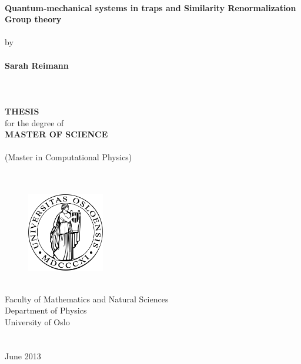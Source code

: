 \begin{titlepage}
\begin{center}
\ \\
{\LARGE \bf Quantum-mechanical systems in traps and Similarity Renormalization Group theory}\\
\ \\
{\Large by}\\
\ \\
{\Large \bf Sarah Reimann}\\
\ \\
\ \\
\ \\
{\large \bf THESIS}\\
{\large for the degree of}\\
{\large \bf MASTER OF SCIENCE}\\
\ \\
(Master in Computational Physics)\\
\ \\
\ \\
\begin{figure}[h!]
\begin{center}
\includegraphics[width=0.3\textwidth]{../Plots/uiologo.pdf}
\end{center}
\end{figure}
\ \\
\Large{\rm Faculty of Mathematics and Natural Sciences}\\
{\rm Department of Physics}\\
{\rm University of Oslo}\\
\ \\
\ \\
{\rm June 2013}
\end{center}
\end{titlepage}